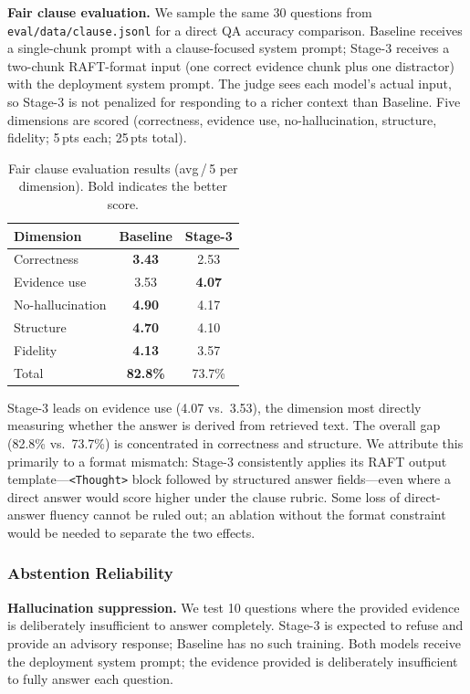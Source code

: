 \documentclass[10pt,conference]{IEEEtran}
\begin{document}
\noindent\textbf{Fair clause evaluation.}
We sample the same 30 questions from \texttt{eval/data/clause.jsonl} for a
direct QA accuracy comparison.
Baseline receives a single-chunk prompt with a clause-focused system prompt;
Stage-3 receives a two-chunk RAFT-format input (one correct evidence chunk
plus one distractor) with the deployment system prompt.
The judge sees each model's actual input, so Stage-3 is not penalized for
responding to a richer context than Baseline.
Five dimensions are scored (correctness, evidence use, no-hallucination,
structure, fidelity; 5\,pts each; 25\,pts total).

\begin{table}[htbp]
\centering
\caption{Fair clause evaluation results (avg\,/\,5 per dimension).
Bold indicates the better score.}
\label{tab:clause}
\small
\begin{tabular}{@{}lcc@{}}
\toprule
Dimension & Baseline & Stage-3 \\
\midrule
Correctness       & \textbf{3.43} & 2.53 \\
Evidence use      & 3.53          & \textbf{4.07} \\
No-hallucination  & \textbf{4.90} & 4.17 \\
Structure         & \textbf{4.70} & 4.10 \\
Fidelity          & \textbf{4.13} & 3.57 \\
\midrule
Total             & \textbf{82.8\%} & 73.7\% \\
\bottomrule
\end{tabular}
\end{table}

Stage-3 leads on evidence use (4.07 vs.\ 3.53), the dimension most directly
measuring whether the answer is derived from retrieved text.
The overall gap (82.8\% vs.\ 73.7\%) is concentrated in correctness and
structure.
We attribute this primarily to a format mismatch: Stage-3 consistently applies
its RAFT output template---\texttt{<Thought>} block followed by structured
answer fields---even where a direct answer would score higher under the clause
rubric.
Some loss of direct-answer fluency cannot be ruled out; an ablation without
the format constraint would be needed to separate the two effects.

\subsubsection{Abstention Reliability}
\label{sec:abstention}

\noindent\textbf{Hallucination suppression.}
We test 10 questions where the provided evidence is deliberately insufficient
to answer completely.
Stage-3 is expected to refuse and provide an advisory response; Baseline has
no such training.
Both models receive the deployment system prompt; the evidence provided is
deliberately insufficient to fully answer each question.
\end{document}
